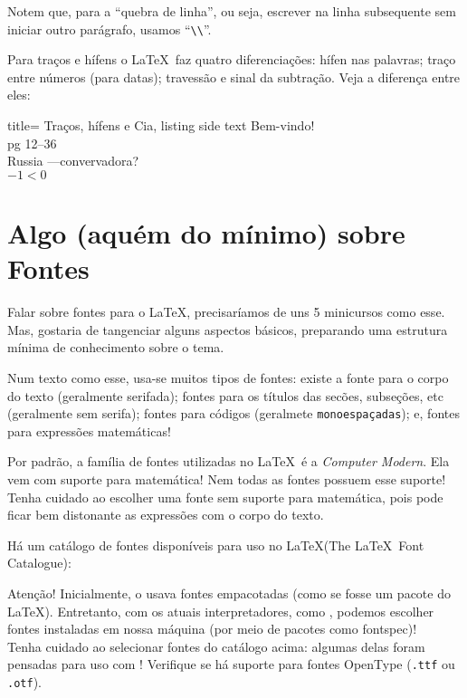 Notem que, para a ``quebra de linha'', ou seja, escrever na linha subsequente sem
iniciar outro parágrafo, usamos ``\Verb|\\|''.

Para traços e hífens o \LaTeX\ faz quatro diferenciações: hífen nas palavras;
traço entre números (para datas); travessão e sinal da subtração.
Veja a diferença entre eles:

\begin{tcblisting}{title= {Traços, hífens e Cia}, listing side text}
Bem-vindo!\\
pg 12--36\\
Russia ---convervadora?\\
$-1 < 0$  
\end{tcblisting}

\section{Algo (aquém do mínimo) sobre Fontes} %
\label{sec:fontes}

Falar sobre \textsf{fontes} para o \LaTeX, precisaríamos de uns 5 minicursos como 
esse.
Mas, gostaria de tangenciar alguns aspectos básicos, preparando uma estrutura 
mínima de conhecimento sobre o tema.

Num texto como esse, usa-se muitos tipos de fontes: existe a fonte para o corpo
do texto (geralmente serifada); fontes para os títulos das secões, subseções, etc
(geralmente \textsf{sem serifa}); fontes para códigos (geralmete \texttt{monoespaçadas});
e, fontes para expressões matemáticas!

Por padrão, a família de fontes utilizadas no \LaTeX\ é a \textit{Computer Modern}.
Ela vem com suporte para matemática!
Nem todas as fontes possuem esse suporte!
Tenha cuidado ao escolher uma fonte sem suporte para matemática, pois pode ficar 
bem distonante as expressões com o corpo do texto.

Há um catálogo de fontes disponíveis para uso no \LaTeX (The \LaTeX\ Font Catalogue):


\begin{atencao}{Atenção!}{\exclamacao}
  Inicialmente, o  usava fontes \textsf{empacotadas} (como se fosse um 
  pacote do \LaTeX{}).
  Entretanto, com os atuais interpretadores, como , podemos escolher 
  fontes instaladas em nossa máquina (por meio de pacotes como \textsf{fontspec})!\\
  Tenha cuidado ao selecionar fontes do catálogo acima: algumas delas foram pensadas
  para uso com !
  Verifique se há suporte para fontes OpenType (\texttt{.ttf} ou \texttt{.otf}).
\end{atencao}

